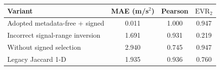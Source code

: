 \begin{tabular}{lccc}
\toprule
Variant & MAE (m/s$^2$) & Pearson & $\mathrm{EVR}_2$ \\
\midrule
Adopted metadata-free + signed & 0.011 & 1.000 & 0.947 \\
Incorrect signal-range inversion & 1.691 & 0.931 & 0.219 \\
Without signed selection & 2.940 & 0.745 & 0.947 \\
Legacy Jaccard 1-D & 1.935 & 0.936 & 0.760 \\
\bottomrule
\end{tabular}
